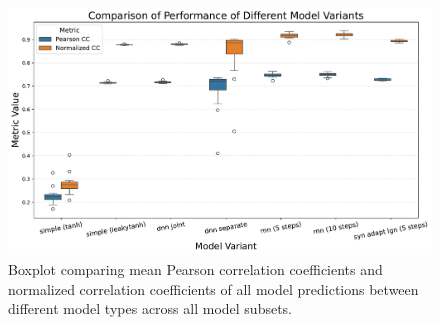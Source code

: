 \begin{figure}
    \centering
    \includegraphics[width=\linewidth]{img/plots/model_types_correlation_comparison.pdf}
    \caption{Boxplot comparing mean Pearson correlation coefficients and normalized correlation coefficients of all model predictions between different model types across all model subsets.}
    \label{fig:model_types_correlation_comparison}
\end{figure}

